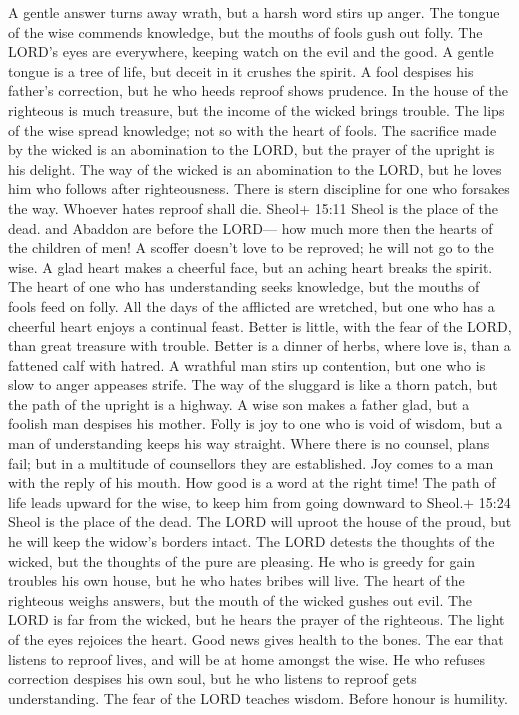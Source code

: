  A gentle answer turns away wrath, but a harsh word stirs up
anger.  The tongue of the wise commends knowledge, but the
mouths of fools gush out folly.  The LORD's eyes are
everywhere, keeping watch on the evil and the good.  A
gentle tongue is a tree of life, but deceit in it crushes the spirit.
 A fool despises his father's correction, but he who heeds
reproof shows prudence.  In the house of the righteous is
much treasure, but the income of the wicked brings trouble. 
The lips of the wise spread knowledge; not so with the heart of fools.
 The sacrifice made by the wicked is an abomination to the
LORD, but the prayer of the upright is his delight.  The way
of the wicked is an abomination to the LORD, but he loves him who
follows after righteousness.  There is stern discipline for
one who forsakes the way. Whoever hates reproof shall die. 
Sheol+ 15:11 Sheol is the place of the dead. and Abaddon are before the
LORD--- how much more then the hearts of the children of men!
 A scoffer doesn't love to be reproved; he will not go to
the wise.  A glad heart makes a cheerful face, but an
aching heart breaks the spirit.  The heart of one who has
understanding seeks knowledge, but the mouths of fools feed on folly.
 All the days of the afflicted are wretched, but one who
has a cheerful heart enjoys a continual feast.  Better is
little, with the fear of the LORD, than great treasure with trouble.
 Better is a dinner of herbs, where love is, than a
fattened calf with hatred.  A wrathful man stirs up
contention, but one who is slow to anger appeases strife. 
The way of the sluggard is like a thorn patch, but the path of the
upright is a highway.  A wise son makes a father glad, but
a foolish man despises his mother.  Folly is joy to one who
is void of wisdom, but a man of understanding keeps his way straight.
 Where there is no counsel, plans fail; but in a multitude
of counsellors they are established.  Joy comes to a man
with the reply of his mouth. How good is a word at the right time!
 The path of life leads upward for the wise, to keep him
from going downward to Sheol.+ 15:24 Sheol is the place of the dead.
 The LORD will uproot the house of the proud, but he will
keep the widow's borders intact.  The LORD detests the
thoughts of the wicked, but the thoughts of the pure are pleasing.
 He who is greedy for gain troubles his own house, but he
who hates bribes will live.  The heart of the righteous
weighs answers, but the mouth of the wicked gushes out evil.
 The LORD is far from the wicked, but he hears the prayer
of the righteous.  The light of the eyes rejoices the
heart. Good news gives health to the bones.  The ear that
listens to reproof lives, and will be at home amongst the wise.
 He who refuses correction despises his own soul, but he
who listens to reproof gets understanding.  The fear of the
LORD teaches wisdom. Before honour is humility.

